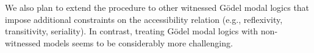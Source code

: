 We also plan to extend the procedure to other witnessed G\"odel modal
logics that impose additional constraints on the accessibility
relation (e.g., reflexivity, transitivity, seriality).  In contrast,
treating G\"odel modal logics with non-witnessed models seems to be
considerably more challenging.




